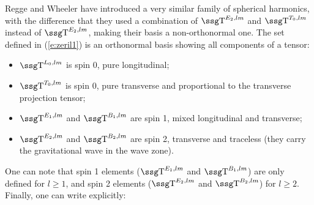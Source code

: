 Regge and Wheeler \cite{ReggeW57} have introduced a very similar
family of spherical 
harmonics, with the difference that they used a combination of
$\w{T}^{E_2, lm}$ and $\w{T}^{T_0, lm}$ instead of $\w{T}^{E_2, lm}$,
making their basis a non-orthonormal one. The set defined in
(\ref{e:zeril1}) is an orthonormal basis showing all components of a
tensor:
\begin{itemize}
\item $\w{T}^{L_0, lm}$ is spin 0, pure longitudinal;
\item $\w{T}^{T_0, lm}$ is spin 0, pure transverse and proportional to the
transverse projection tensor;
\item $\w{T}^{E_1, lm}$ and $\w{T}^{B_1, lm}$ are spin 1, mixed
longitudinal and transverse;
\item $\w{T}^{E_2, lm}$ and $\w{T}^{B_2, lm}$ are spin 2, transverse
and traceless (they carry the gravitational wave in the wave zone).
\end{itemize}
One can note that spin 1 elements ($\w{T}^{E_1, lm}$ and
$\w{T}^{B_1, lm}$) are only defined for $l \geq 1$, and spin 2 elements
($\w{T}^{E_2, lm}$ and $\w{T}^{B_2, lm}$) for $l \geq 2$. Finally, one
can write explicitly:
